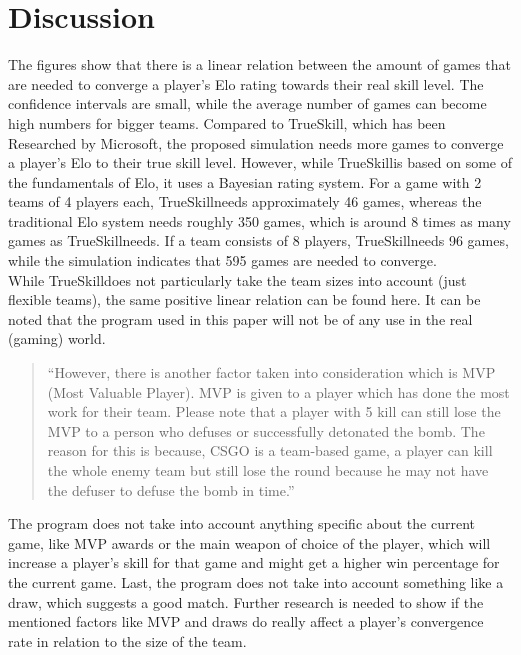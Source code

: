 \documentclass[12pt]{article}
\begin{document}
\section{Discussion}
The figures show that there is a linear relation between the amount of games that are needed to converge a player's Elo rating towards their real skill level. The confidence intervals are small, while the average number of games can become high numbers for bigger teams. Compared to TrueSkill\texttrademark, which has been Researched by Microsoft, the proposed simulation needs more games to converge a player's Elo to their true skill level. However, while TrueSkill\texttrademark is based on some of the fundamentals of Elo, it uses a Bayesian rating system.\cite{trueskill} For a game with 2 teams of 4 players each, TrueSkill\texttrademark needs approximately 46 games\cite{trueskillconvergence}, whereas the traditional Elo system needs roughly 350 games, which is around 8 times as many games as TrueSkill\texttrademark needs. If a team consists of 8 players, TrueSkill\texttrademark needs 96 games, while the simulation indicates that 595 games are needed to converge.\\
While TrueSkill\texttrademark does not particularly take the team sizes into account (just flexible teams), the same positive linear relation can be found here. It can be noted that the program used in this paper will not be of any use in the real (gaming) world.
\begin{quote}
	``However, there is another factor taken into consideration which is MVP (Most Valuable Player). MVP is given to a player which has done the most work for their team. Please note that a player with 5 kill can still lose the MVP to a person who defuses or successfully detonated the bomb. The reason for this is because, CSGO is a team-based game, a player can kill the whole enemy team but still lose the round because he may not have the defuser to defuse the bomb in time.''\cite{csgo}
\end{quote}

The program does not take into account anything specific about the current game, like MVP awards or the main weapon of choice of the player, which will increase a player's skill for that game and might get a higher win percentage for the current game. Last, the program does not take into account something like a draw, which suggests a good match\cite{trueskillconvergence}. Further research is needed to show if the mentioned factors like MVP and draws do really affect a player's convergence rate in relation to the size of the team.
\end{document}

